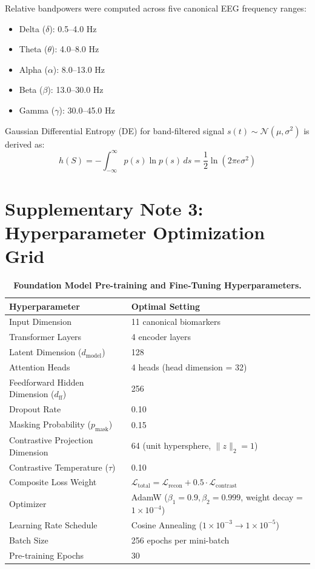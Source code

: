 \documentclass[11pt,a4paper]{article}
\begin{document}
Relative bandpowers were computed across five canonical EEG frequency ranges:
\begin{itemize}
    \item Delta ($\delta$): 0.5--4.0 Hz
    \item Theta ($\theta$): 4.0--8.0 Hz
    \item Alpha ($\alpha$): 8.0--13.0 Hz
    \item Beta ($\beta$): 13.0--30.0 Hz
    \item Gamma ($\gamma$): 30.0--45.0 Hz
\end{itemize}

Gaussian Differential Entropy (DE) for band-filtered signal $s(t) \sim \mathcal{N}(\mu, \sigma^2)$ is derived as:
\begin{equation}
h(S) = -\int_{-\infty}^\infty p(s) \ln p(s) \, ds = \frac{1}{2} \ln(2 \pi e \sigma^2)
\end{equation}

\section*{Supplementary Note 3: Hyperparameter Optimization Grid}

\begin{table}[h]
\centering
\small
\caption{\textbf{Foundation Model Pre-training and Fine-Tuning Hyperparameters.}}
\label{tab:hyperparams}
\vspace{0.5em}
\begin{tabularx}{\textwidth}{lX}
\toprule
\textbf{Hyperparameter} & \textbf{Optimal Setting} \\
\midrule
Input Dimension & 11 canonical biomarkers \\
Transformer Layers & 4 encoder layers \\
Latent Dimension ($d_{\text{model}}$) & 128 \\
Attention Heads & 4 heads (head dimension = 32) \\
Feedforward Hidden Dimension ($d_{\text{ff}}$) & 256 \\
Dropout Rate & 0.10 \\
Masking Probability ($p_{\text{mask}}$) & 0.15 \\
Contrastive Projection Dimension & 64 (unit hypersphere, $\|z\|_2 = 1$) \\
Contrastive Temperature ($\tau$) & 0.10 \\
Composite Loss Weight & $\mathcal{L}_{\text{total}} = \mathcal{L}_{\text{recon}} + 0.5 \cdot \mathcal{L}_{\text{contrast}}$ \\
Optimizer & AdamW ($\beta_1 = 0.9, \beta_2 = 0.999$, weight decay = $1 \times 10^{-4}$) \\
Learning Rate Schedule & Cosine Annealing ($1 \times 10^{-3} \to 1 \times 10^{-5}$) \\
Batch Size & 256 epochs per mini-batch \\
Pre-training Epochs & 30 \\
\bottomrule
\end{tabularx}
\end{table}
\end{document}
